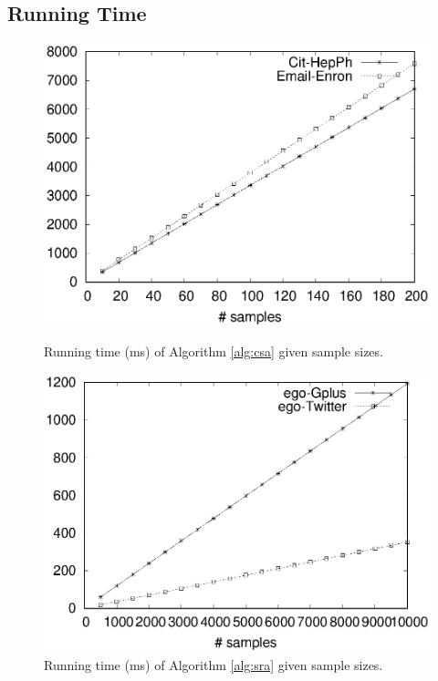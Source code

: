\documentclass{article}
\begin{document}
\subsection{Running Time}
\begin{figure}[!t]
\centering
\begin{minipage}{.45\textwidth}
\centering
\includegraphics[width=.9\textwidth]{cos_runtime.eps}
\caption{Running time (ms) of Algorithm \ref{alg:csa} given sample sizes.}
\label{fig:run_cos}
\end{minipage}
\hspace{1cm}
\begin{minipage}{.45\textwidth}
\centering
\includegraphics[width=.9\textwidth]{simrank_runtime.eps}
\caption{Running time (ms) of Algorithm \ref{alg:sra} given sample sizes.}
\label{fig:run_sr}
\end{minipage}
\end{figure}
\end{document}
